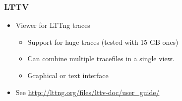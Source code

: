 \begin{frame}
  \frametitle{LTTV}
  \begin{itemize}
  \item Viewer for LTTng traces
    \begin{itemize}
    \item Support for huge traces (tested with 15 GB ones)
    \item Can combine multiple tracefiles in a single view.
    \item Graphical or text interface
    \end{itemize}
    \item See \url{http://lttng.org/files/lttv-doc/user_guide/}
  \end{itemize}
\end{frame}

